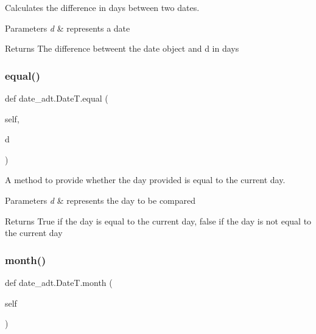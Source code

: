 Calculates the difference in days between two dates. 


\begin{DoxyParams}{Parameters}
{\em d} & represents a date \\
\hline
\end{DoxyParams}
\begin{DoxyReturn}{Returns}
The difference betweent the date object and d in days 
\end{DoxyReturn}
\mbox{\label{classdate__adt_1_1_date_t_acd9b4a721c3ef4629fa056a67af5d79d}} 
\subsubsection{\texorpdfstring{equal()}{equal()}}
{\footnotesize\ttfamily def date\+\_\+adt.\+Date\+T.\+equal (\begin{DoxyParamCaption}\item[{}]{self,  }\item[{}]{d }\end{DoxyParamCaption})}



A method to provide whether the day provided is equal to the current day. 


\begin{DoxyParams}{Parameters}
{\em d} & represents the day to be compared \\
\hline
\end{DoxyParams}
\begin{DoxyReturn}{Returns}
True if the day is equal to the current day, false if the day is not equal to the current day 
\end{DoxyReturn}
\mbox{\label{classdate__adt_1_1_date_t_aad0e41fc53976c15837be62d0f5cbbbf}} 
\subsubsection{\texorpdfstring{month()}{month()}}
{\footnotesize\ttfamily def date\+\_\+adt.\+Date\+T.\+month (\begin{DoxyParamCaption}\item[{}]{self }\end{DoxyParamCaption})}



